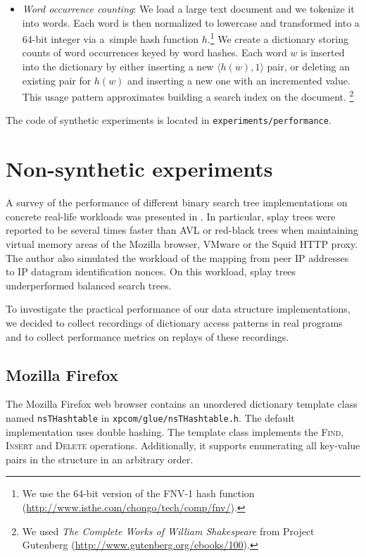 \begin{itemize}
\item
	\emph{Word occurrence counting}: We load a large text document
	and we tokenize it into words. Each word is then normalized
	to lowercase and transformed into a 64-bit integer via a~simple
	hash function $h$.\footnote{%
		We use the 64-bit version of the FNV-1 hash function
		(\url{http://www.isthe.com/chongo/tech/comp/fnv/}).
	} We create a dictionary storing counts of word
	occurrences keyed by word hashes. Each word $w$ is inserted into
	the dictionary by either inserting a new $\langle h(w), 1\rangle$ pair,
	or deleting an existing pair for $h(w)$ and inserting a new one
	with an incremented value.
	This usage pattern approximates building a search index on the document.
	\footnote{%
		We used \emph{The Complete Works of William Shakespeare}
		from Project Gutenberg
		(\url{http://www.gutenberg.org/ebooks/100}).
	}
\end{itemize}
The code of synthetic experiments is located in \texttt{experiments/performance}.

\section{Non-synthetic experiments}

A survey of the performance of different binary search tree implementations
on concrete real-life workloads was presented in \cite{libavl}.
In particular, splay trees were reported to be several times faster than AVL or
red-black trees when maintaining virtual memory areas of the Mozilla browser,
VMware or the Squid HTTP proxy. The author also simulated the workload of
the mapping from peer IP addresses to IP datagram identification nonces.
On this workload, splay trees underperformed balanced search trees.

To investigate the practical performance of our data structure implementations,
we decided to collect recordings of dictionary access patterns in real programs
and to collect performance metrics on replays of these recordings.

\subsection{Mozilla Firefox}
The Mozilla Firefox web browser contains an unordered dictionary template class
named \texttt{nsTHashtable} in \texttt{xpcom/glue/nsTHashtable.h}.
The default implementation uses double hashing. The template class implements
the \textsc{Find}, \textsc{Insert} and \textsc{Delete} operations. Additionally,
it supports enumerating all key-value pairs in the structure in an arbitrary
order.

